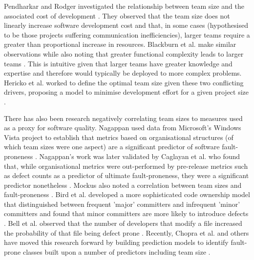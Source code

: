 Pendharkar and Rodger investigated the relationship between team size and the associated cost of development \citep{pendharkar2009relationship}. They observed that the team size does not linearly increase software development cost and that, in some cases (hypothesised to be those projects suffering communication inefficiencies), larger teams require a greater than proportional increase in resources. Blackburn et al. make similar observations while also noting that greater functional complexity leads to larger teams \citep{blackburn2006brooks}. This is intuitive given that larger teams have greater knowledge and expertise and therefore would typically be deployed to more complex problems. Hericko et al. worked to define the optimal team size given these two conflicting drivers, proposing a model to minimise development effort for a given project size \citep{herivcko2008approach}.

There has also been research negatively correlating team sizes to measures used as a proxy for software quality. Nagappan used data from Microsoft's Windows Vista project to establish that metrics based on organisational structures (of which team sizes were one aspect) are a significant predictor of software fault-proneness \citep{nagappan2008influence}. Nagappan's work was later validated by Caglayan et al. who found that, while organisational metrics were out-performed by pre-release metrics such as defect counts as a predictor of ultimate fault-proneness, they were a significant predictor nonetheless \citep{caglayan2015merits}. Mockus also noted a correlation between team sizes and fault-proneness \citep{mockus2010organizational}. Bird et al. developed a more sophisticated code ownership model that distinguished between frequent 'major' committers and infrequent 'minor' committers and found that minor committers are more likely to introduce defects \citep{bird2011don}. Bell et al. observed that the number of developers that modify a file increased the probability of that file being defect prone \citep{bell2013limited}. Recently, Chopra et al. and others have moved this research forward by building prediction models to identify fault-prone classes built upon a number of predictors including team size \citep{madeyski2015process, chopra2018empirical}.

